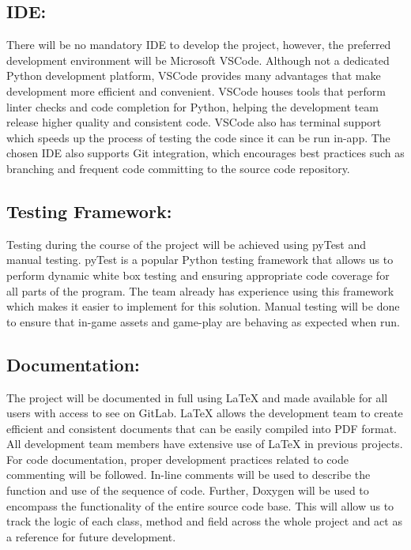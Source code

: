 \documentclass{article}
\begin{document}
\subsection*{IDE:}

There will be no mandatory IDE to develop the project, however, the preferred
development environment will be Microsoft VSCode. Although not a dedicated
Python development platform, VSCode provides many advantages that make
development more efficient and convenient. VSCode houses tools that perform
linter checks and code completion for Python, helping the development team
release higher quality and consistent code. VSCode also has terminal support
which speeds up the process of testing the code since it can be run in-app. The
chosen IDE also supports Git integration, which encourages best practices such
as branching and frequent code committing to the source code repository.

\subsection*{Testing Framework:}

Testing during the course of the project will be achieved using pyTest and
manual testing. pyTest is a popular Python testing framework that allows us to
perform dynamic white box testing and ensuring appropriate code coverage for all
parts of the program. The team already has experience using this framework which
makes it easier to implement for this solution. Manual testing will be done to
ensure that in-game assets and game-play are behaving as expected when run.

\subsection*{Documentation:}

The project will be documented in full using LaTeX and made available for all
users with access to see on GitLab. LaTeX allows the development team to create
efficient and consistent documents that can be easily compiled into PDF format.
All development team members have extensive use of LaTeX in previous projects.
For code documentation, proper development practices related to code commenting
will be followed. In-line comments will be used to describe the function and use
of the sequence of code. Further, Doxygen will be used to encompass the
functionality of the entire source code base. This will allow us to track the
logic of each class, method and field across the whole project and act as a
reference for future development.
\end{document}
